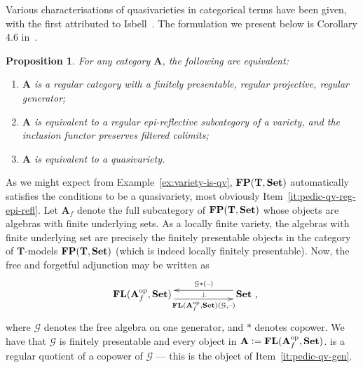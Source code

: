 \documentclass[11pt, a4paper, twoside,leqno]{amsart}
\newcommand{\cat}[1]{\mathbf{#1}}
\newcommand{\thg}{{\mathord{\text{--}}}}
\newcommand{\defeq}{\mathrel{\mathop:}=}
\newcommand{\cd}[2][]{\vcenter{\hbox{\xymatrix#1{#2}}}}
\numberwithin{equation}{section}
\theoremstyle{plain}
\newtheorem{Prop}[Thm]{Proposition}
\theoremstyle{definition}
\newcommand{\Set}{\cat{Set}}
\DeclareMathOperator{\FP}{\bf FP}
\DeclareMathOperator{\FL}{\bf FL}
\begin{document}
Various characterisations of quasivarieties in categorical terms have
been given, with the first attributed to Isbell~\cite{Isbell:1964aa}. The formulation
we present below is Corollary 4.6 in~\cite{Pedicchio:2000aa}.
\begin{Prop}
  \label{prop:quasivariety-reg-epi-refl}
  For any category \(\cat{A}\), the following are equivalent:
  \begin{enumerate}[label=(\alph*), ref=(\alph*)]
  \item
    \label{it:pedic-qv-gen}
    \(\cat{A}\) is a regular category with a finitely presentable,
    regular projective, regular generator;
  \item
    \label{it:pedic-qv-reg-epi-refl}
    \(\cat{A}\) is equivalent to a regular epi-reflective subcategory of a variety, and the inclusion
    functor preserves filtered colimits;
  \item
    \label{it:pedic-qv}
    \(\cat{A}\) is equivalent to a quasivariety.
  \end{enumerate}
\end{Prop}
As we might expect from Example~\ref{ex:variety-is-qv},
\(\FP(\cat{T},\Set)\) automatically satisfies the conditions to be a
quasivariety, most obviously Item~\ref{it:pedic-qv-reg-epi-refl}.
Let \(\cat{A}_{f}\) denote the full subcategory of \(\FP(\cat{T},
\cat{Set})\) whose objects are algebras with finite underlying sets. As a locally finite variety, the algebras with finite underlying set are precisely the
finitely presentable objects in the category of \(\cat{T}\)-models \(\FP(\cat{T},
\cat{Set})\) (which is indeed locally finitely presentable).  Now, the free and forgetful adjunction may be written as
\begin{equation}
  \label{eq:hom-adj-free-gen}
  \xymatrixcolsep{5pc}
  \xymatrixrowsep{3.5pc}
  \cd{
    {\FL(\cat{A}_{f}^{\mathrm{op}},\cat{Set})}
    \ar@<-4.5pt>[r]_-{\FL(\cat{A}_{f}^{\mathrm{op}},\cat{Set})(\mathcal{G}, \thg)} \ar@{<-}@<4.5pt>[r]^-{\mathcal{G}\ast (\thg)} \ar@{}[r]|-{\bot} &
    {\Set}
    \rlap{ ,}
  }
\end{equation}
where \(\mathcal{G}\) denotes the free algebra on one generator, and
\(\ast\) denotes copower. We have that \(\mathcal{G}\) is finitely
presentable and every object in \(\cat{A}
\defeq \FL(\cat{A}_{f}^{\mathrm{op}},\cat{Set})\). is a regular
quotient of a copower of \(\mathcal{G}\) --- this is the object of Item~\ref{it:pedic-qv-gen}.
\end{document}
